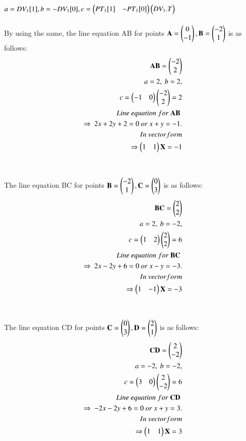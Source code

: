 \documentclass[journal,12pt,twocolumn]{IEEEtran}
\begin{document}
$a= DV_1[1],\\ b=-DV_1[0],\\ c = \begin{pmatrix}PT_1[1]&-PT_1[0]\end{pmatrix} \begin{pmatrix}DV_1.T\end{pmatrix}$
\\
\\
By using the same, the line equation AB for points $\mathbf{A} = \begin{pmatrix}0\\-1\end{pmatrix},\mathbf{B}=\begin{pmatrix}-2\\1\end{pmatrix}$ is as follows:
\\
\begin{align}
\begin{split}
\mathbf{AB} = \begin{pmatrix}-2\\2\end{pmatrix}\\
a=2,\ b=2,\\
c=\begin{pmatrix}-1 & 0\end{pmatrix} \begin{pmatrix}-2\\2\end{pmatrix}=2\\
Line\ equation\ for\ \mathbf{AB}\ \\ \Rightarrow\ 2x+2y+2=0 \ or \ x+y=-1. \\
In\ vector form\\
\Rightarrow \begin{pmatrix}1&1\end{pmatrix}\mathbf{X}=-1\\
\end{split}
\end{align}
\\
\\
The line equation BC for points $\mathbf{B} = \begin{pmatrix}-2\\1\end{pmatrix},\mathbf{C}=\begin{pmatrix}0\\3\end{pmatrix}$ is as follows:
\\
\begin{align}
\begin{split}
\mathbf{BC} = \begin{pmatrix}2\\2\end{pmatrix}\\
a=2,\ b=-2,\\
c=\begin{pmatrix}1 & 2\end{pmatrix} \begin{pmatrix}2\\2\end{pmatrix}=6\\
Line\ equation\ for\ \mathbf{BC}\ \\ \Rightarrow\ 2x-2y+6=0 \ or \ x-y=-3. \\
In\ vector form\\
\Rightarrow \begin{pmatrix}1&-1\end{pmatrix}\mathbf{X}=-3
\end{split}
\end{align}
\\
\\
The line equation CD for points $\mathbf{C}=\begin{pmatrix}0\\3\end{pmatrix},\mathbf{D} = \begin{pmatrix}2\\1\end{pmatrix}$ is as follows:
\\
\begin{align}
\begin{split}
\mathbf{CD} = \begin{pmatrix}2\\-2\end{pmatrix}\\
a=-2,\ b=-2,\\
c=\begin{pmatrix}3 & 0\end{pmatrix} \begin{pmatrix}2\\-2\end{pmatrix}=6\\
Line\ equation\ for\ \mathbf{CD}\ \\ \Rightarrow\ -2x-2y+6=0 \ or \ x+y=3. \\
In\ vector form\\
\Rightarrow \begin{pmatrix}1&1\end{pmatrix}\mathbf{X}=3
\end{split}
\end{align}
\end{document}
